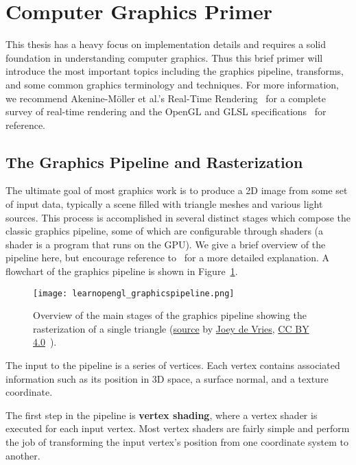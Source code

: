 \section{Computer Graphics Primer}
This thesis has a heavy focus on implementation details and requires a solid foundation in understanding computer graphics. Thus this brief primer will introduce the most important topics including the graphics pipeline, transforms, and some common graphics terminology and techniques. For more information, we recommend Akenine-M{\"o}ller et al.'s Real-Time Rendering~\cite{moller2008rtr} for a complete survey of real-time rendering and the OpenGL and GLSL specifications~\cite{opengl45spec,glsl45spec} for reference.

\subsection{The Graphics Pipeline and Rasterization}
The ultimate goal of most graphics work is to produce a 2D image from some set of input data, typically a scene filled with triangle meshes and various light sources. This process is accomplished in several distinct stages which compose the classic graphics pipeline, some of which are configurable through shaders (a shader is a program that runs on the GPU). We give a brief overview of the pipeline here, but encourage reference to~\cite{moller2008rtr} for a more detailed explanation. A flowchart of the graphics pipeline is shown in Figure~\ref{fig:pipeline}.

\begin{figure}[h]
\centering
\texttt{[image: learnopengl\_graphicspipeline.png]}
\caption{Overview of the main stages of the graphics pipeline showing the rasterization of a single triangle (\href{https://learnopengl.com/img/getting-started/pipeline.png}{source} by \href{https://twitter.com/JoeyDeVriez}{Joey de Vries}, \href{https://creativecommons.org/licenses/by/4.0/}{CC BY 4.0}~\cite{learnopengl}).}
\label{fig:pipeline}
\end{figure}

The input to the pipeline is a series of vertices. Each vertex contains associated information such as its position in 3D space, a surface normal, and a texture coordinate.

The first step in the pipeline is \textbf{vertex shading}, where a vertex shader is executed for each input vertex. Most vertex shaders are fairly simple and perform the job of transforming the input vertex's position from one coordinate system to another.

